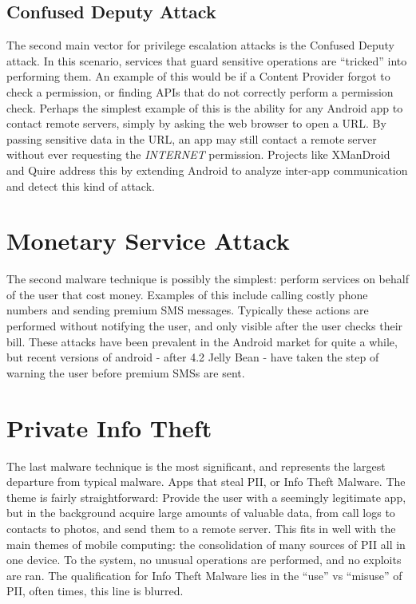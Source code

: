 \subsection{Confused Deputy Attack}
The second main vector for privilege escalation attacks is the Confused Deputy attack\citep{hardy1988confused}. In this scenario, services that guard sensitive operations are ``tricked'' into performing them. An example of this would be if a Content Provider forgot to check a permission, or finding APIs that do not correctly perform a permission check. Perhaps the simplest example of this is the ability for any Android app to contact remote servers, simply by asking the web browser to open a URL. By passing sensitive data in the URL, an app may still contact a remote server without ever requesting the \textit{INTERNET} permission. Projects like XManDroid\citep{bugiel2011xmandroid} and Quire\citep{dietz2011quire} address this by extending Android to analyze inter-app communication and detect this kind of attack. %

\section{Monetary Service Attack}
The second malware technique is possibly the simplest: perform services on behalf of the user that cost money. Examples of this include calling costly phone numbers and sending premium SMS messages. Typically these actions are performed without notifying the user, and only visible after the user checks their bill. These attacks have been prevalent in the Android market for quite a while, but recent versions of android - after 4.2 Jelly Bean - have taken the step of warning the user before premium SMSs are sent. %


\section{Private Info Theft}
The last malware technique is the most significant, and represents the largest departure from typical malware. Apps that steal PII, or Info Theft Malware. The theme is fairly straightforward: Provide the user with a seemingly legitimate app, but in the background acquire large amounts of valuable data, from call logs to contacts to photos, and send them to a remote server. This fits in well with the main themes of mobile computing: the consolidation of many sources of PII all in one device. 
To the system, no unusual operations are performed, and no exploits are ran. The qualification for Info Theft Malware lies in the ``use'' vs ``misuse'' of PII, often times, this line is blurred.

